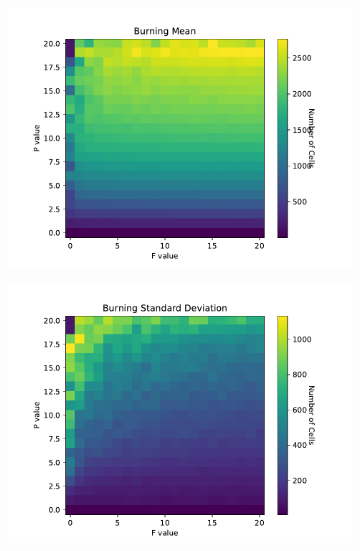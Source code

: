 \documentclass{article}
\begin{document}
\begin{figure}[H]
\centering
\begin{subfigure}{.5\textwidth}
    \centering
    \includegraphics[scale=0.4]{Burning Mean 2.pdf}
    \label{fig:livemean3D}
\end{subfigure}%
\begin{subfigure}{.5\textwidth}
    \centering
    \includegraphics[scale=0.4]{Burning STD 2.pdf}
    \label{fig:livestd}
\end{subfigure}
\label{fig:live}
\end{figure}
\end{document}
